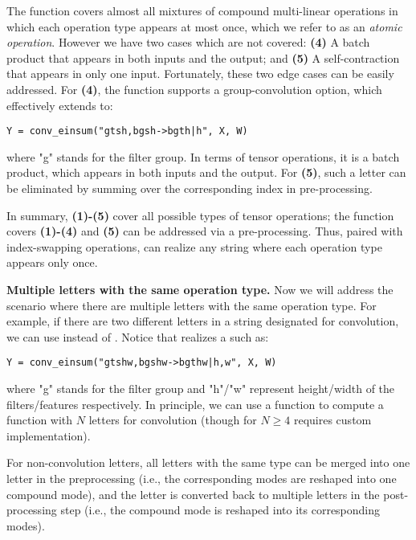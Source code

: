 The \convOne function covers almost all mixtures of compound multi-linear operations in which each operation type appears at most once, which we refer to as an \textit{atomic operation}. However we have two cases which are not covered:
\textbf{(4)} A batch product that appears in both inputs and the output; and
\textbf{(5)} A self-contraction that appears in only one input.
Fortunately, these two edge cases can be easily addressed.
For \textbf{(4)}, the function \convOne supports a group-convolution option, which effectively extends to:
\begin{lstlisting}
Y = conv_einsum("gtsh,bgsh->bgth|h", X, W)
\end{lstlisting}
\vspace{-1em}
where \textsf{"g"} stands for the filter group. In terms of tensor operations, it is a batch product, which appears in both inputs and the output. For \textbf{(5)}, such a letter can be eliminated by summing over the corresponding index in pre-processing.

In summary, \textbf{(1)-(5)} cover all possible types of tensor operations; the function \convOne covers \textbf{(1)-(4)} and \textbf{(5)} can be addressed via a pre-processing. Thus, paired with index-swapping operations, \convOne can realize any \conveinsum string where each operation type appears only once.

\textbf{Multiple letters with the same operation type.} 
Now we will address the scenario where there are multiple letters with the same operation type. For example, if there are two different letters in a \conveinsum string designated for convolution, we can use \convTwo instead of \convOne. Notice that \convTwo realizes a \conveinsum such as:
\begin{lstlisting}
Y = conv_einsum("gtshw,bgshw->bgthw|h,w", X, W)
\end{lstlisting}
\vspace{-1em}
where \textsf{"g"}  stands for the filter group and \textsf{"h"}/\textsf{"w"}  represent height/width of the filters/features respectively. In principle, we can use a \convNd function to compute a \conveinsum function with $N$ letters for convolution (though \convNd for $N \geq 4$ requires custom implementation).

For non-convolution letters, all letters with the same type can be merged into one letter in the preprocessing (i.e., the corresponding modes are reshaped into one compound mode), and the letter is converted back to multiple letters in the post-processing step (i.e., the compound mode is reshaped into its corresponding modes).

